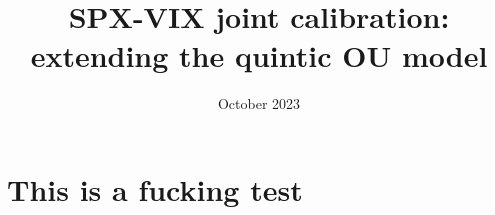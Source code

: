 \documentclass[a4paper, 12pt]{article}
\title{SPX-VIX joint calibration: extending the quintic OU model}
\author{}
\date{October 2023}
\begin{document}
\maketitle

\section{This is a fucking test}
\end{document}
